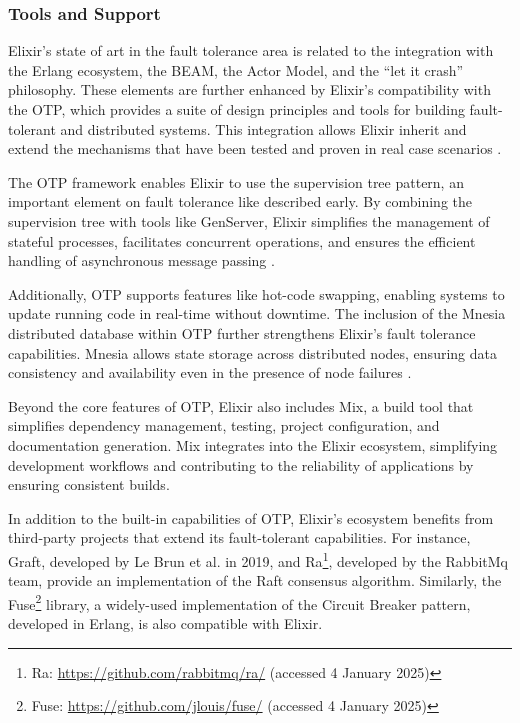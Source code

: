 \subsubsection{Tools and Support}

Elixir’s state of art in the fault tolerance area is related to the integration with the Erlang ecosystem, the \gls{BEAM}, the Actor Model, and the “let it crash” philosophy. These elements are further enhanced by Elixir’s compatibility with the \gls{OTP}, which provides a suite of design principles and tools for building fault-tolerant and distributed systems. This integration allows Elixir inherit and extend the mechanisms that have been tested and proven in real case scenarios \cite{Juric2024,Armstrong2013}.

The \gls{OTP} framework enables Elixir to use the supervision tree pattern, an important element on fault tolerance like described early. By combining the supervision tree with tools like GenServer, Elixir simplifies the management of stateful processes, facilitates concurrent operations, and ensures the efficient handling of asynchronous message passing \cite{elixir-docs-hexdocs}.

Additionally, \gls{OTP} supports features like hot-code swapping, enabling systems to update running code in real-time without downtime. The inclusion of the Mnesia distributed database within \gls{OTP} further strengthens Elixir’s fault tolerance capabilities. Mnesia allows state storage across distributed nodes, ensuring data consistency and availability even in the presence of node failures \cite{elixir-docs-hexdocs,elixir-school}.

Beyond the core features of \gls{OTP}, Elixir also includes Mix, a build tool that simplifies dependency management, testing, project configuration, and documentation generation. Mix integrates into the Elixir ecosystem, simplifying development workflows and contributing to the reliability of applications by ensuring consistent builds\cite{elixir-docs-hexdocs,elixir-school}.

In addition to the built-in capabilities of \gls{OTP}, Elixir’s ecosystem benefits from third-party projects that extend its fault-tolerant capabilities. For instance, Graft, developed by Le Brun et al. \cite{LeBrun2021} in 2019, and Ra\footnote{Ra: \url{https://github.com/rabbitmq/ra/} (accessed 4 January 2025)}, developed by the RabbitMq team, provide an implementation of the Raft consensus algorithm. Similarly, the Fuse\footnote{Fuse: \url{https://github.com/jlouis/fuse/} (accessed 4 January 2025)} library,
a widely-used implementation of the Circuit Breaker pattern, developed in Erlang, is also compatible with Elixir.

